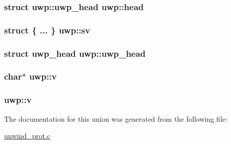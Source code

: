 \subsubsection[{\texorpdfstring{head}{head}}]{\setlength{\rightskip}{0pt plus 5cm}struct {\bf uwp\+::uwp\+\_\+head}  uwp\+::head}\hypertarget{unionuwp_acab4a7765952e1452e4d9035cdacbab5}{}\label{unionuwp_acab4a7765952e1452e4d9035cdacbab5}
\subsubsection[{\texorpdfstring{sv}{sv}}]{\setlength{\rightskip}{0pt plus 5cm}struct \{ ... \}   uwp\+::sv}\hypertarget{unionuwp_a0cbb85b5e389ab3d685c0cc51ba5c2bc}{}\label{unionuwp_a0cbb85b5e389ab3d685c0cc51ba5c2bc}
\subsubsection[{\texorpdfstring{uwp\+\_\+head}{uwp_head}}]{\setlength{\rightskip}{0pt plus 5cm}struct {\bf uwp\+\_\+head} {\bf uwp\+::uwp\+\_\+head}}\hypertarget{unionuwp_af1c38672e3b54d0270b807e058a28fd0}{}\label{unionuwp_af1c38672e3b54d0270b807e058a28fd0}
\subsubsection[{\texorpdfstring{v}{v}}]{\setlength{\rightskip}{0pt plus 5cm}char$\ast$ uwp\+::v}\hypertarget{unionuwp_a79612c93285a8ff48fa1b6184a5e97eb}{}\label{unionuwp_a79612c93285a8ff48fa1b6184a5e97eb}
\subsubsection[{\texorpdfstring{v}{v}}]{ uwp\+::v}\hypertarget{unionuwp_afdb9e38dfd8fb6b7ed4d7f8a7f3d7c11}{}\label{unionuwp_afdb9e38dfd8fb6b7ed4d7f8a7f3d7c11}


The documentation for this union was generated from the following file\+:\begin{DoxyCompactItemize}
\item 
\hyperlink{unwind__prot_8c}{unwind\+\_\+prot.\+c}\end{DoxyCompactItemize}
